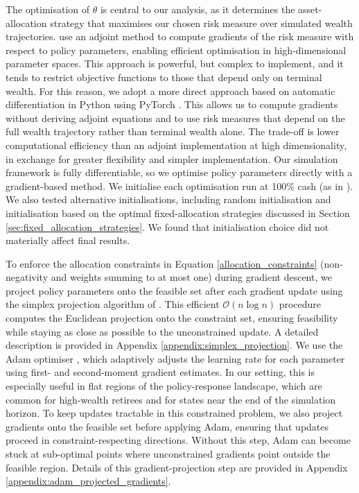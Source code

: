 \documentclass[11pt]{article}
\begin{document}
The optimisation of \(\theta\) is central to our analysis, as it determines the asset-allocation strategy that maximises our chosen risk measure over simulated wealth trajectories. \textcite{Makinen2024} use an adjoint method to compute gradients of the risk measure with respect to policy parameters, enabling efficient optimisation in high-dimensional parameter spaces. This approach is powerful, but complex to implement, and it tends to restrict objective functions to those that depend only on terminal wealth. For this reason, we adopt a more direct approach based on automatic differentiation in Python using PyTorch \parencite{pytorch}. This allows us to compute gradients without deriving adjoint equations and to use risk measures that depend on the full wealth trajectory rather than terminal wealth alone. The trade-off is lower computational efficiency than an adjoint implementation at high dimensionality, in exchange for greater flexibility and simpler implementation. Our simulation framework is fully differentiable, so we optimise policy parameters directly with a gradient-based method. We initialise each optimisation run at 100\% cash (as in \textcite{Makinen2024}). We also tested alternative initialisations, including random initialisation and initialisation based on the optimal fixed-allocation strategies discussed in Section \ref{sec:fixed_allocation_strategies}. We found that initialisation choice did not materially affect final results.

To enforce the allocation constraints in Equation \ref{allocation_constraints} (non-negativity and weights summing to at most one) during gradient descent, we project policy parameters onto the feasible set after each gradient update using the simplex projection algorithm of \textcite{duchi2008efficient}. This efficient \(\mathcal{O}(n \log n)\) procedure computes the Euclidean projection onto the constraint set, ensuring feasibility while staying as close as possible to the unconstrained update. A detailed description is provided in Appendix \ref{appendix:simplex_projection}. We use the Adam optimiser \parencite{adam}, which adaptively adjusts the learning rate for each parameter using first- and second-moment gradient estimates. In our setting, this is especially useful in flat regions of the policy-response landscape, which are common for high-wealth retirees and for states near the end of the simulation horizon. To keep updates tractable in this constrained problem, we also project gradients onto the feasible set before applying Adam, ensuring that updates proceed in constraint-respecting directions. Without this step, Adam can become stuck at sub-optimal points where unconstrained gradients point outside the feasible region. Details of this gradient-projection step are provided in Appendix \ref{appendix:adam_projected_gradients}.
\end{document}

